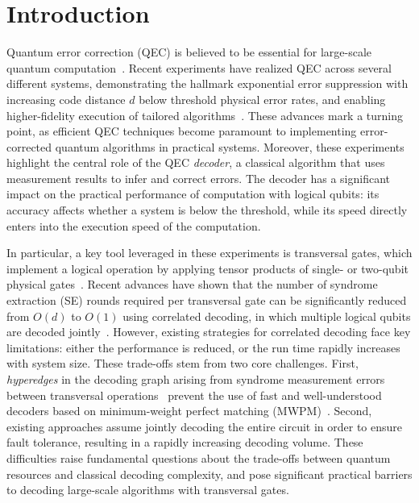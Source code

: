 \documentclass[prx,twocolumn,secnumarabic,balancelastpage,amsmath,amssymb,longbibliography]{revtex4-2}
\begin{document}
\maketitle
\section{Introduction}
Quantum error correction (QEC) is believed to be essential for large-scale quantum computation~\cite{shor1994algorithms, preskill1998reliable, dennis2002topological, nielsen2010quantum, kitaev2003fault}.
%
Recent experiments have realized QEC across several different systems, demonstrating the hallmark exponential error suppression with increasing code distance $d$ below threshold physical error rates, and enabling higher-fidelity execution of tailored algorithms~\cite{bluvstein2024logical,acharya2024quantum,reichardt2024logical,ryan-anderson2024high,ryan-anderson2022implementing}.
%
These advances mark a turning point, as efficient QEC techniques become paramount to implementing error-corrected quantum algorithms in practical systems.
%
Moreover, these experiments highlight the central role of the QEC \textit{decoder}, a classical algorithm that uses measurement results to infer and correct errors. 
%
The decoder has a significant impact on the practical performance of computation with logical qubits: its accuracy affects whether a system is below the threshold, while its speed directly enters into the execution speed of the computation. 

In particular, a key tool leveraged in these experiments is transversal gates, which implement a logical operation by applying tensor products of single- or two-qubit physical gates~\cite{bluvstein2022quantum, postler2022demonstration, ryan-anderson2022implementing, honciuc2024implementing, wang2023fault, bluvstein2024logical}. 
%
Recent advances have shown that the number of syndrome extraction (SE) rounds required per transversal gate can be significantly reduced from $O(d)$ to $O(1)$ using correlated decoding, in which multiple logical qubits are decoded jointly~\cite{bluvstein2024logical, cain2024correlated, zhou2024algorithmic}.
%
However, existing strategies for correlated decoding face key limitations: either the performance is reduced, or the run time rapidly increases with system size. 
%
These trade-offs stem from two core challenges.
%
First, \textit{hyperedges} in the decoding graph arising from syndrome measurement errors between transversal operations~\cite{cain2024correlated,sahay2024error,wan2024iterative,wu2024hypergraph} prevent the use of fast and well-understood decoders based on minimum-weight perfect matching (MWPM)~\cite{dennis2002topological,higgott2025sparse,wu2023fusion}.
% 
Second, existing approaches assume jointly decoding the entire circuit in order to ensure fault tolerance, resulting in a rapidly increasing decoding volume. 
%
These difficulties raise fundamental questions about the trade-offs between quantum resources and classical decoding complexity, and pose significant practical barriers to decoding large-scale algorithms with transversal gates.
\end{document}
